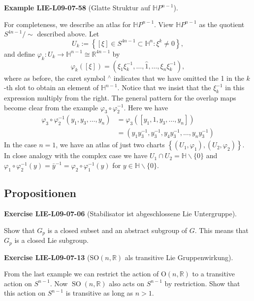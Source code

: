 \documentclass[10pt, letterpaper]{article}
\newcommand{\R}{\mathbb{R}}
\newcommand{\SO}{\mathrm{SO}}
\newcommand{\CustomHeading}[3]{%
  \par\medskip\noindent%
  \textbf{#1 #2} \textnormal{(#3)}.\enskip%
}
\newenvironment{EXA}[2]{\CustomHeading{Example}{#1}{#2}}{}
\newenvironment{EXE}[2]{\CustomHeading{Exercise}{#1}{#2}}{}
\begin{document}
\begin{EXA}{LIE-L09-07-58}{Glatte Struktur auf $\mathbb{H}P^{n-1}$}
For completeness, we describe an atlas for $\mathbb{H} P^{n-1}$. View $\mathbb{H} P^{n-1}$ as the quotient $S^{4 n-1} / \sim$ described above. Let
$$
U_{k}:=\left\{[\xi] \in S^{4 n-1} \subset \mathbb{H}^{n}: \xi^{k} \neq 0\right\},
$$
and define $\varphi_{k}: U_{k} \rightarrow \mathbb{H}^{n-1} \cong \mathbb{R}^{4 n-1}$ by
$$
\varphi_{k}([\xi])=\left(\xi_{1} \xi_{k}^{-1}, \ldots, \widehat{1}, \ldots, \xi_{n} \xi_{k}^{-1}\right),
$$
where as before, the caret symbol ${ }^{\wedge}$ indicates that we have omitted the 1 in the $k$-th slot to obtain an element of $\mathbb{H}^{n-1}$. Notice that we insist that the $\xi_{k}^{-1}$ in this expression multiply from the right. The general pattern for the overlap maps become clear from the example $\varphi_{3} \circ \varphi_{2}^{-1}$. Here we have
$$
\begin{aligned}
\varphi_{3} \circ \varphi_{2}^{-1}\left(y_{1}, y_{3}, \ldots, y_{n}\right) & =\varphi_{3}\left(\left[y_{1}, 1, y_{3}, \ldots, y_{n}\right]\right) \\
& =\left(y_{1} y_{3}^{-1}, y_{3}^{-1}, y_{4} y_{3}^{-1}, \ldots, y_{n} y_{3}^{-1}\right)
\end{aligned}
$$
In the case $n=1$, we have an atlas of just two charts $\left\{\left(U_{1}, \varphi_{1}\right),\left(U_{2}, \varphi_{2}\right)\right\}$. In close analogy with the complex case we have $U_{1} \cap U_{2}=\mathbb{H} \backslash\{0\}$ and $\varphi_{1} \circ \varphi_{2}^{-1}(y)=\bar{y}^{-1}=\varphi_{2} \circ \varphi_{1}^{-1}(y)$ for $y \in \mathbb{H} \backslash\{0\}$.
\end{EXA}

\subsection{Propositionen}

\begin{EXE}{LIE-L09-07-06}{Stabilisator ist abgeschlossene Lie Untergruppe}
Show that $G_{p}$ is a closed subset and an abstract subgroup of $G$. This means that $G_{p}$ is a closed Lie subgroup.
\end{EXE}

\begin{EXE}{LIE-L09-07-13}{$\SO(n,\R)$ als transitive Lie Gruppenwirkung}
From the last example we can restrict the action of $\mathrm{O}(n, \mathbb{R})$ to a transitive action on $S^{n-1}$. Now $\operatorname{SO}(n, \mathbb{R})$ also acts on $S^{n-1}$ by restriction. Show that this action on $S^{n-1}$ is transitive as long as $n>1$.
\end{EXE}
\end{document}
